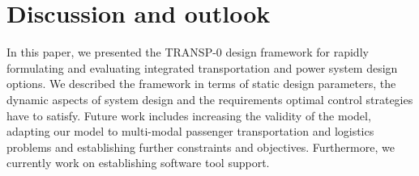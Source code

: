 \section{Discussion and outlook}
\label{conclusion}

In this paper, we presented the TRANSP-0 design framework for rapidly formulating and evaluating integrated transportation and power system design options. We described the framework in terms of static design parameters, the dynamic aspects of system design and the requirements optimal control strategies have to satisfy.
Future work includes increasing the validity of the model, adapting our model to multi-modal passenger transportation and logistics problems and establishing further constraints and objectives. Furthermore, we currently work on establishing software tool support.

